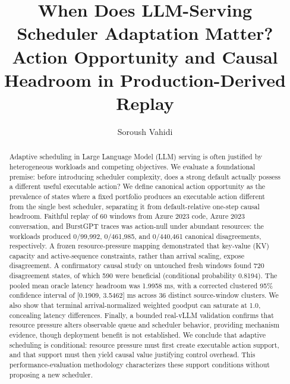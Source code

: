 \documentclass[preprint,12pt]{elsarticle}
\begin{document}
\title{When Does LLM-Serving Scheduler Adaptation Matter?\\
Action Opportunity and Causal Headroom in Production-Derived Replay}


\author{Soroush Vahidi}

\address{New Jersey Institute of Technology, Newark, NJ, USA}


\newcommand{\anwg}{\mathrm{arrival-normalized weighted goodput}}
\newcommand{\sbs}{\mathrm{single best scheduler}}
\newcommand{\vbs}{\mathrm{VBS}}
\newcommand{\policy}[1]{\texttt{\detokenize{#1}}}

\maketitle

\begin{abstract}
Adaptive scheduling in Large Language Model (LLM) serving is often justified by heterogeneous workloads and competing objectives. We evaluate a foundational premise: before introducing scheduler complexity, does a strong default actually possess a different useful executable action? We define canonical action opportunity as the prevalence of states where a fixed portfolio produces an executable action different from the single best scheduler, separating it from default-relative one-step causal headroom. Faithful replay of 60 windows from Azure 2023 code, Azure 2023 conversation, and BurstGPT traces was action-null under abundant resources: the workloads produced 0/99,992, 0/461,985, and 0/440,461 canonical disagreements, respectively. A frozen resource-pressure mapping demonstrated that key-value (KV) capacity and active-sequence constraints, rather than arrival scaling, expose disagreement. A confirmatory causal study on untouched fresh windows found 720 disagreement states, of which 590 were beneficial (conditional probability 0.8194). The pooled mean oracle latency headroom was 1.9958 ms, with a corrected clustered 95\% confidence interval of [0.1909, 3.5462] ms across 36 distinct source-window clusters. We also show that terminal arrival-normalized weighted goodput can saturate at 1.0, concealing latency differences. Finally, a bounded real-vLLM validation confirms that resource pressure alters observable queue and scheduler behavior, providing mechanism evidence, though deployment benefit is not established. We conclude that adaptive scheduling is conditional: resource pressure must first create executable action support, and that support must then yield causal value justifying control overhead. This performance-evaluation methodology characterizes these support conditions without proposing a new scheduler.
\end{abstract}
\end{document}
